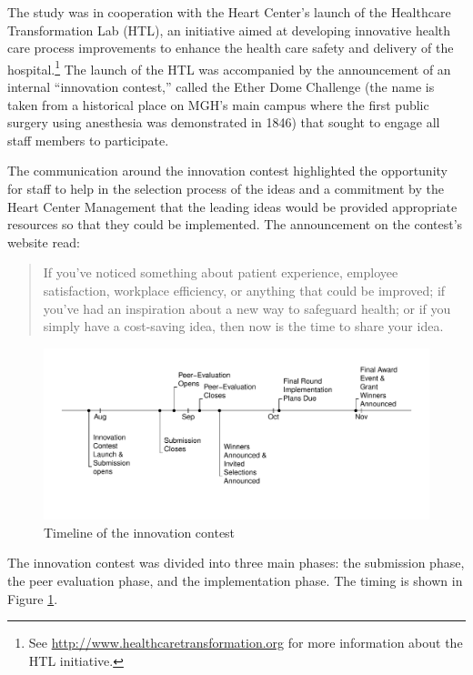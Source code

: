 \documentclass[11pt, titlepage]{article}
\begin{document}
The study was in cooperation with the Heart Center's launch of the
Healthcare Transformation Lab (HTL), an initiative aimed at developing
innovative health care process improvements to enhance the health care
safety and delivery of the hospital.\footnote{See
  \url{http://www.healthcaretransformation.org} for more information
  about the HTL initiative.} The launch of the HTL was accompanied by
the announcement of an internal ``innovation contest,'' called the Ether
Dome Challenge (the name is taken from a historical place on MGH's main
campus where the first public surgery using anesthesia was demonstrated
in 1846) that sought to engage all staff members to participate.

The communication around the innovation contest highlighted the
opportunity for staff to help in the selection process of the ideas and
a commitment by the Heart Center Management that the leading ideas would
be provided appropriate resources so that they could be implemented. The
announcement on the contest's website read:

\begin{quote}
If you've noticed something about patient experience, employee
satisfaction, workplace efficiency, or anything that could be improved;
if you've had an inspiration about a new way to safeguard health; or if
you simply have a cost-saving idea, then now is the time to share your
idea.
\end{quote}

\begin{figure}
\centering
\includegraphics{Figures/timeline-1.pdf}
\caption{Timeline of the innovation contest\label{fig: phase}}
\end{figure}

The innovation contest was divided into three main phases: the
submission phase, the peer evaluation phase, and the implementation
phase. The timing is shown in Figure \ref{fig: phase}.
\end{document}
